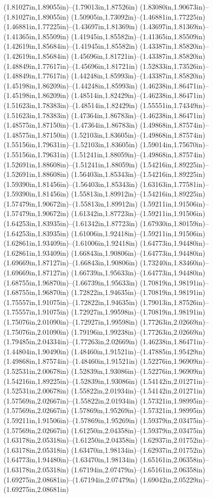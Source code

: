 (1.81027in,1.89055in)--(1.79013in,1.87526in) (1.83080in,1.90673in)--(1.81027in,1.89055in) (1.50905in,1.73092in)--(1.46881in,1.77225in) (1.46881in,1.77225in)--(1.43697in,1.81369in) (1.43697in,1.81369in)--(1.41365in,1.85509in) (1.41945in,1.85582in)--(1.41365in,1.85509in) (1.42619in,1.85684in)--(1.41945in,1.85582in) (1.43387in,1.85820in)--(1.42619in,1.85684in) (1.45696in,1.81721in)--(1.43387in,1.85820in) (1.48849in,1.77617in)--(1.45696in,1.81721in) (1.52833in,1.73526in)--(1.48849in,1.77617in) (1.44248in,1.85993in)--(1.43387in,1.85820in) (1.45198in,1.86209in)--(1.44248in,1.85993in) (1.46238in,1.86471in)--(1.45198in,1.86209in) (1.48514in,1.82429in)--(1.46238in,1.86471in) (1.51623in,1.78383in)--(1.48514in,1.82429in) (1.55551in,1.74349in)--(1.51623in,1.78383in) (1.47364in,1.86783in)--(1.46238in,1.86471in) (1.48575in,1.87150in)--(1.47364in,1.86783in) (1.49868in,1.87574in)--(1.48575in,1.87150in) (1.52103in,1.83605in)--(1.49868in,1.87574in) (1.55156in,1.79631in)--(1.52103in,1.83605in) (1.59014in,1.75670in)--(1.55156in,1.79631in) (1.51241in,1.88059in)--(1.49868in,1.87574in) (1.52691in,1.88608in)--(1.51241in,1.88059in) (1.54216in,1.89225in)--(1.52691in,1.88608in) (1.56403in,1.85343in)--(1.54216in,1.89225in) (1.59390in,1.81456in)--(1.56403in,1.85343in) (1.63163in,1.77581in)--(1.59390in,1.81456in) (1.55813in,1.89912in)--(1.54216in,1.89225in) (1.57479in,1.90672in)--(1.55813in,1.89912in) (1.59211in,1.91506in)--(1.57479in,1.90672in) (1.61342in,1.87723in)--(1.59211in,1.91506in) (1.64253in,1.83935in)--(1.61342in,1.87723in) (1.67930in,1.80159in)--(1.64253in,1.83935in) (1.61006in,1.92418in)--(1.59211in,1.91506in) (1.62861in,1.93409in)--(1.61006in,1.92418in) (1.64773in,1.94480in)--(1.62861in,1.93409in) (1.66843in,1.90806in)--(1.64773in,1.94480in) (1.69669in,1.87127in)--(1.66843in,1.90806in) (1.73240in,1.83460in)--(1.69669in,1.87127in) (1.66739in,1.95633in)--(1.64773in,1.94480in) (1.68755in,1.96870in)--(1.66739in,1.95633in) (1.70819in,1.98191in)--(1.68755in,1.96870in) (1.72822in,1.94635in)--(1.70819in,1.98191in) (1.75557in,1.91075in)--(1.72822in,1.94635in) (1.79013in,1.87526in)--(1.75557in,1.91075in) (1.72927in,1.99598in)--(1.70819in,1.98191in) (1.75076in,2.01090in)--(1.72927in,1.99598in) (1.77263in,2.02669in)--(1.75076in,2.01090in) (1.79196in,1.99238in)--(1.77263in,2.02669in) (1.79485in,2.04334in)--(1.77263in,2.02669in) (1.46238in,1.86471in)--(1.44804in,1.90490in) (1.48460in,1.91521in)--(1.47885in,1.95429in) (1.49868in,1.87574in)--(1.48460in,1.91521in) (1.52276in,1.96909in)--(1.52531in,2.00678in) (1.52839in,1.93086in)--(1.52276in,1.96909in) (1.54216in,1.89225in)--(1.52839in,1.93086in) (1.54142in,2.01271in)--(1.52531in,2.00678in) (1.55822in,2.01934in)--(1.54142in,2.01271in) (1.57569in,2.02667in)--(1.55822in,2.01934in) (1.57321in,1.98995in)--(1.57569in,2.02667in) (1.57869in,1.95269in)--(1.57321in,1.98995in) (1.59211in,1.91506in)--(1.57869in,1.95269in) (1.59379in,2.03475in)--(1.57569in,2.02667in) (1.61250in,2.04358in)--(1.59379in,2.03475in) (1.63178in,2.05318in)--(1.61250in,2.04358in) (1.62937in,2.01752in)--(1.63178in,2.05318in) (1.63470in,1.98134in)--(1.62937in,2.01752in) (1.64773in,1.94480in)--(1.63470in,1.98134in) (1.65161in,2.06358in)--(1.63178in,2.05318in) (1.67194in,2.07479in)--(1.65161in,2.06358in) (1.69275in,2.08681in)--(1.67194in,2.07479in) (1.69042in,2.05229in)--(1.69275in,2.08681in) 